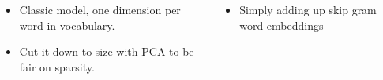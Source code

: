 \documentclass[a0papper, landscape]{tikzposter}
\begin{document}
\begin{columns}
        

    
	{
		{
			\begin{itemize}
				\item Classic model, one dimension per word in vocabulary.
				\item Cut it down to size with PCA to be fair on sparsity.
			\end{itemize}
			\par   	
		}
		\vspace{2ex}
		{
			\begin{itemize}
				\item Simply adding up skip gram word embeddings
			\end{itemize}
		     \small{}
		}

		\vspace{2ex}

}
\end{columns}
\end{document}
